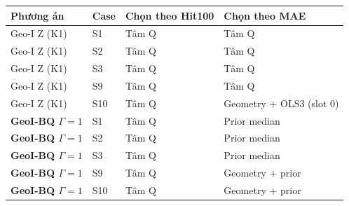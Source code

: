 \par\smallskip\noindent\begin{tabularx}{\linewidth}{@{}P{3.7cm}P{1cm}YY@{}}\toprule
\textbf{Phương án} & \textbf{Case} & \textbf{Chọn theo Hit100} & \textbf{Chọn theo MAE} \\
\midrule
Geo-I Z (K1) & S1 & Tâm Q & Tâm Q \\
Geo-I Z (K1) & S2 & Tâm Q & Tâm Q \\
Geo-I Z (K1) & S3 & Tâm Q & Tâm Q \\
Geo-I Z (K1) & S9 & Tâm Q & Tâm Q \\
Geo-I Z (K1) & S10 & Tâm Q & Geometry + OLS3 (slot 0) \\
\textbf{GeoI-BQ $\Gamma=1$} & S1 & Tâm Q & Prior median \\
\textbf{GeoI-BQ $\Gamma=1$} & S2 & Tâm Q & Prior median \\
\textbf{GeoI-BQ $\Gamma=1$} & S3 & Tâm Q & Prior median \\
\textbf{GeoI-BQ $\Gamma=1$} & S9 & Tâm Q & Geometry + prior \\
\textbf{GeoI-BQ $\Gamma=1$} & S10 & Tâm Q & Geometry + prior \\
\bottomrule\end{tabularx}\par\smallskip
